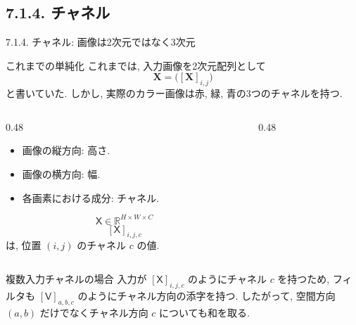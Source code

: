 \documentclass[dvipdfmx,uplatex,unicode,9pt,aspectratio=169]{beamer}
\newcommand{\R}{\mathbb{R}}
\newcommand{\X}{\mathbf{X}}
\newcommand{\Vten}{\mathsf{V}}
\newcommand{\Xten}{\mathsf{X}}
\begin{document}
\subsection{7.1.4. チャネル}
\begin{frame}{7.1.4. チャネル: 画像は2次元ではなく3次元}
\begin{block}{これまでの単純化}
これまでは, 入力画像を2次元配列として
\[
  \X=\bigl([\X]_{i,j}\bigr)
\]
と書いていた.
しかし, 実際のカラー画像は赤, 緑, 青の3つのチャネルを持つ.
\end{block}

\begin{columns}[T,totalwidth=\textwidth]
\begin{column}{0.48\textwidth}
\begin{itemize}
  \item 画像の縦方向: 高さ.
  \item 画像の横方向: 幅.
  \item 各画素における成分: チャネル.
\end{itemize}

\[
  \Xten \in \R^{H\times W\times C}
\]
\[
  [\Xten]_{i,j,c}
\]
は, 位置 $(i,j)$ のチャネル $c$ の値.
\end{column}

\begin{column}{0.48\textwidth}
\centering
{}
\end{column}
\end{columns}
\begin{block}{複数入力チャネルの場合}
入力が $[\Xten]_{i,j,c}$ のようにチャネル $c$ を持つため,
フィルタも $[\Vten]_{a,b,c}$ のようにチャネル方向の添字を持つ.
したがって, 空間方向 $(a,b)$ だけでなくチャネル方向 $c$ についても和を取る.
\end{block}
\end{frame}
\end{document}
